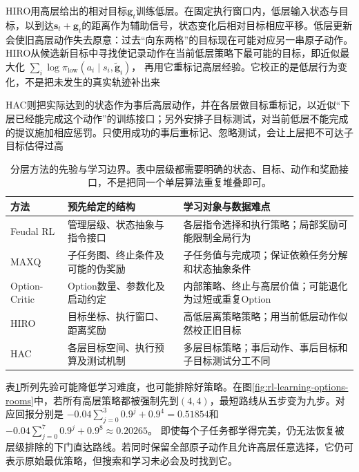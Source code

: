 HIRO用高层给出的相对目标$\bm g_t$训练低层。在固定执行窗口内，低层输入状态与目标，以到达$\bm s_t+\bm g_t$的距离作为辅助信号，状态变化后相对目标相应平移。低层更新会使旧高层动作失去原意：过去“向东两格”的目标现在可能对应另一串原子动作。HIRO从候选新目标中寻找使记录动作在当前低层策略下最可能的目标，即近似最大化
$\sum_i\log\pi_{\mathrm{low}}(a_i\mid s_i,\widetilde{\bm g}_i)$，
再用它重标记高层经验。它校正的是低层行为变化，不是把未发生的真实轨迹补出来

HAC则把实际达到的状态作为事后高层动作，并在各层做目标重标记，以近似“下层已经能完成这个动作”的训练接口；另外安排子目标测试，对当前低层不能完成的提议施加相应惩罚。只使用成功的事后重标记、忽略测试，会让上层把不可达子目标估得过高

\begin{table}[t]
  \centering
  \small
  \begin{tabularx}{\linewidth}{>{\raggedright\arraybackslash}p{22mm} >{\raggedright\arraybackslash}X >{\raggedright\arraybackslash}X}
    \toprule
    方法 & 预先给定的结构 & 学习对象与数据难点 \\
    \midrule
    Feudal RL & 管理层级、状态抽象与指令接口 & 各层指令选择和执行策略；局部奖励可能限制全局行为 \\
    MAXQ & 子任务图、终止条件及可能的伪奖励 & 子任务值与完成项；保证依赖任务分解和状态抽象条件 \\
    Option-Critic & Option数量、参数化及启动约定 & 内部策略、终止与高层价值；可能退化为过短或重复Option \\
    HIRO & 目标坐标、执行窗口、距离奖励 & 高低层离策略策略；用当前低层动作似然校正旧目标 \\
    HAC & 各层目标空间、执行预算及测试机制 & 多层目标策略；事后动作、事后目标和子目标测试分工不同 \\
    \bottomrule
  \end{tabularx}
  \caption{分层方法的先验与学习边界。表中层级都需要明确的状态、目标、动作和奖励接口，不是把同一个单层算法重复堆叠即可。}
  \label{tab:rl-learning-hierarchy-methods}
\end{table}

表\ref{tab:rl-learning-hierarchy-methods}所列先验可能降低学习难度，也可能排除好策略。在图\ref{fig:rl-learning-options-rooms}中，若所有高层策略都被强制先到$(4,4)$，最短路线从五步变为九步。对应回报分别是
$-0.04\sum_{j=0}^{3}0.9^j+0.9^4=0.51854$和
$-0.04\sum_{j=0}^{7}0.9^j+0.9^8\approx0.20265$。
即使每个子任务都学得完美，仍无法恢复被层级排除的下门直达路线。若同时保留全部原子动作且允许高层任意选择，它仍可表示原始最优策略，但搜索和学习未必会及时找到它。

